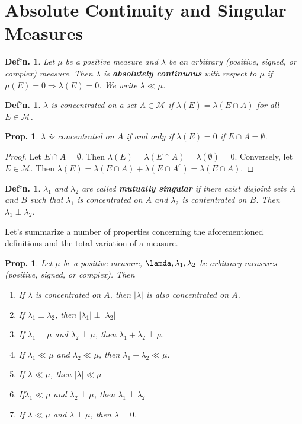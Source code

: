\documentclass[12pt, a4paper]{book}
\newtheorem{definition}[theorem]{Def'n.}
\newtheorem{proposition}[theorem]{Prop.}
\theoremstyle{nonumberplain}
\newtheorem{proof}{Proof}
\begin{document}
\section{Absolute Continuity and Singular Measures}
\begin{definition}
    Let $\mu$ be a positive measure and $\lambda$ be an arbitrary (positive, signed, or complex) measure.
    Then $\lambda$ is \textbf{absolutely continuous} with respect to $\mu$ if $\mu(E)=0\Rightarrow\lambda(E)=0$.
    We write $\lambda\ll\mu$.
\end{definition}
\begin{definition}
    $\lambda$ is concentrated on a set $A\in\mathcal{M}$ if $\lambda(E)=\lambda(E\cap A)$ for all $E\in\mathcal{M}$.
\end{definition}
\begin{proposition}
    $\lambda$ is concentrated on $A$ if and only if $\lambda(E)=0$ if $E\cap A=\emptyset$.
\end{proposition}
\begin{proof}
    Let $E\cap A=\emptyset$.
    Then $\lambda(E)=\lambda(E\cap A)=\lambda(\emptyset)=0$.
    Conversely, let $E\in\mathcal{M}$.
    Then $\lambda(E)=\lambda(E\cap A)+\lambda(E\cap A^c)=\lambda(E\cap A)$.
\end{proof}
\begin{definition}
    $\lambda_1$ and $\lambda_2$ are called \textbf{mutually singular} if there exist disjoint sets $A$ and $B$ such that $\lambda_1$ is concentrated on $A$ and $\lambda_2$ is contentrated on $B$.
    Then $\lambda_1\perp\lambda_2$.
\end{definition}
Let's summarize a number of properties concerning the aforementioned definitions and the total variation of a measure.
\begin{proposition}
    Let $\mu$ be a positive measure, $\lamda,\lambda_1,\lambda_2$ be arbitrary measures (positive, signed, or complex).
    Then
    \begin{enumerate}[nolistsep]
        \item If $\lambda$ is concentrated on $A$, then $|\lambda|$ is also concentrated on $A$.
        \item If $\lambda_1\perp\lambda_2$, then $|\lambda_1|\perp|\lambda_2|$
        \item If $\lambda_1\perp\mu$ and $\lambda_2\perp\mu$, then $\lambda_1+\lambda_2\perp\mu$.
        \item If $\lambda_1\ll\mu$ and $\lambda_2\ll\mu$, then $\lambda_1+\lambda_2\ll\mu$.
        \item If $\lambda\ll\mu$, then $|\lambda|\ll\mu$
        \item If$\lambda_1\ll\mu$ and $\lambda_2\perp\mu$, then $\lambda_1\perp\lambda_2$
        \item If $\lambda\ll\mu$ and $\lambda\perp\mu$, then $\lambda=0$.
    \end{enumerate}
\end{proposition}
\end{document}
